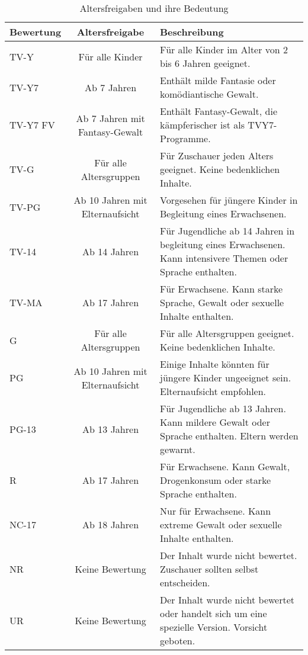 \documentclass[
]{article}
\begin{document}
\begin{longtable}[t]{>{\raggedright\arraybackslash}p{5em}c>{\raggedright\arraybackslash}p{25em}}
\caption{\label{tab:unnamed-chunk-2}Altersfreigaben und ihre Bedeutung}\\
\toprule
Bewertung & Altersfreigabe & Beschreibung\\
\midrule
TV-Y & Für alle Kinder & Für alle Kinder im Alter von 2 bis 6 Jahren geeignet.\\
TV-Y7 & Ab 7 Jahren & Enthält milde Fantasie oder komödiantische Gewalt.\\
TV-Y7 FV & Ab 7 Jahren mit Fantasy-Gewalt & Enthält Fantasy-Gewalt, die kämpferischer ist als TVY7-Programme.\\
TV-G & Für alle Altersgruppen & Für Zuschauer jeden Alters geeignet. Keine bedenklichen Inhalte.\\
TV-PG & Ab 10 Jahren mit Elternaufsicht & Vorgesehen für jüngere Kinder in Begleitung eines Erwachsenen.\\
\addlinespace
TV-14 & Ab 14 Jahren & Für Jugendliche ab 14 Jahren in begleitung eines Erwachsenen. Kann intensivere Themen oder Sprache enthalten.\\
TV-MA & Ab 17 Jahren & Für Erwachsene. Kann starke Sprache, Gewalt oder sexuelle Inhalte enthalten.\\
G & Für alle Altersgruppen & Für alle Altersgruppen geeignet. Keine bedenklichen Inhalte.\\
PG & Ab 10 Jahren mit Elternaufsicht & Einige Inhalte könnten für jüngere Kinder ungeeignet sein. Elternaufsicht empfohlen.\\
PG-13 & Ab 13 Jahren & Für Jugendliche ab 13 Jahren. Kann mildere Gewalt oder Sprache enthalten. Eltern werden gewarnt.\\
\addlinespace
R & Ab 17 Jahren & Für Erwachsene. Kann Gewalt, Drogenkonsum oder starke Sprache enthalten.\\
NC-17 & Ab 18 Jahren & Nur für Erwachsene. Kann extreme Gewalt oder sexuelle Inhalte enthalten.\\
NR & Keine Bewertung & Der Inhalt wurde nicht bewertet. Zuschauer sollten selbst entscheiden.\\
UR & Keine Bewertung & Der Inhalt wurde nicht bewertet oder handelt sich um eine spezielle Version. Vorsicht geboten.\\
\bottomrule
\end{longtable}
\end{document}
